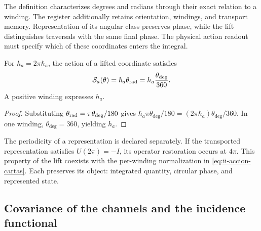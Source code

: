 The definition characterizes degrees and radians through their exact relation
to a winding. The register additionally retains orientation, windings, and
transport memory. Representation of its angular class preserves
phase, while the lift distinguishes traversals with the same
final phase. The physical action readout must specify which of
these coordinates enters the integral.

\begin{proposition}
For \(h_a=2\pi\hbar_a\), the action of a lifted coordinate
satisfies
\begin{equation}
 \mathcal S_a(\theta)
 =\hbar_a\theta_{\rm rad}
 =h_a\frac{\theta_{\deg}}{360}.
 \label{eq:ii-accion-cartas}
\end{equation}
A positive winding expresses \(h_a\).
\end{proposition}
\begin{proof}
Substituting \(\theta_{\rm rad}=\pi\theta_{\deg}/180\) gives
\(\hbar_a\pi\theta_{\deg}/180
=(2\pi\hbar_a)\theta_{\deg}/360\). In one winding,
\(\theta_{\deg}=360\), yielding \(h_a\).
\end{proof}

The periodicity of a representation is declared separately. If the
transported representation satisfies \(U(2\pi)=-I\), its operator
restoration occurs at \(4\pi\). This property of the lift
coexists with the per-winding normalization in
\eqref{eq:ii-accion-cartas}. Each preserves its object: integrated
quantity, circular phase, and represented state.

\subsection{Covariance of the channels and the incidence functional}

